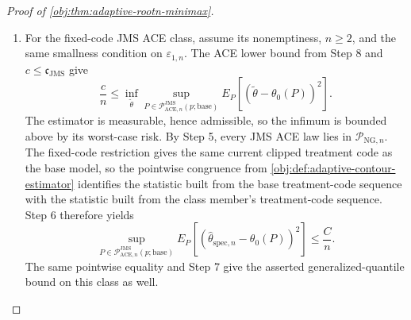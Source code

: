 \begin{proof}[Proof of \cref{obj:thm:adaptive-rootn-minimax}]
\begin{enumerate}
\item For the fixed-code JMS ACE class, assume its nonemptiness, \(n\ge2\), and the same smallness condition on \(\varepsilon_{1,n}\).  The ACE lower bound from Step 8 and \(c\le\mathfrak c_{\mathrm{JMS}}\) give
\[
\frac{c}{n}
\le
\inf_{\widetilde\theta}
\sup_{P\in\mathcal P_{\mathrm{ACE},n}^{\mathrm{JMS}}(p;\mathrm{base})}
E_P\!\left[
(\widetilde\theta-\theta_0(P))^2
\right].
\]
The estimator is measurable, hence admissible, so the infimum is bounded above by its worst-case risk.  By Step 5, every JMS ACE law lies in \(\mathcal P_{\mathrm{NG},n}\).  The fixed-code restriction gives the same current clipped treatment code as the base model, so the pointwise congruence from \cref{obj:def:adaptive-contour-estimator} identifies the statistic built from the base treatment-code sequence with the statistic built from the class member's treatment-code sequence.  Step 6 therefore yields
\[
\sup_{P\in\mathcal P_{\mathrm{ACE},n}^{\mathrm{JMS}}(p;\mathrm{base})}
E_P\!\left[
(\widehat\theta_{\mathrm{spec},n}-\theta_0(P))^2
\right]
\le
\frac{C}{n}.
\]
The same pointwise equality and Step 7 give the asserted generalized-quantile bound on this class as well. %
\end{enumerate}
\end{proof}

